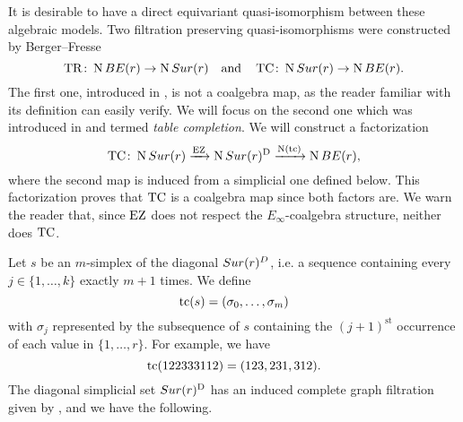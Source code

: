 It is desirable to have a direct equivariant quasi-isomorphism between these algebraic models.
Two filtration preserving quasi-isomorphisms were constructed by Berger--Fresse
\[
\operatorname{TR} \colon \operatorname{N}BE(r) \to \operatorname{N}Sur(r)
\quad \text{and} \quad
\operatorname{TC} \colon \operatorname{N}Sur(r) \to \operatorname{N} BE(r).
\]
The first one, introduced in \cite[1$\cdot$3]{berger2004combinatorial}, is not a coalgebra map, as the reader familiar with its definition can easily verify.
We will focus on the second one which was introduced in \cite{berger2002prismatic} and termed \textit{table completion}.
We will construct a factorization
\[
\operatorname{TC} \colon \operatorname{N}Sur(r) \xrightarrow{\operatorname{EZ}} \operatorname{N}Sur(r)^{\mathrm{D}} \xrightarrow{\operatorname{N}(\operatorname{tc})} \operatorname{N} BE(r),
\]
where the second map is induced from a simplicial one defined below.
This factorization proves that $\operatorname{TC}$ is a coalgebra map since both factors are.
We warn the reader that, since $\operatorname{EZ}$ does not respect the $E_\infty$-coalgebra structure,
neither does $\operatorname{TC}$.

%


Let $s$ be an $m$-simplex of the diagonal $Sur(r)^D$, i.e. a sequence containing every $j \in \{1,\dots,k\}$ exactly $m+1$ times.
We define
\[
\operatorname{tc}(s) = (\sigma_0,\dots,\sigma_m)
\]
with $\sigma_j$ represented by the subsequence of $s$ containing the $(j+1)^{\mathrm{st}}$ occurrence of each value in $\{1,\dots,r\}$.
For example, we have
\[
\operatorname{tc}(122333112) = (123,231,312).
\]
The diagonal simplicial set $Sur(r)^{\mathrm{D}}$ has an induced complete graph filtration given by , and we have the following.

